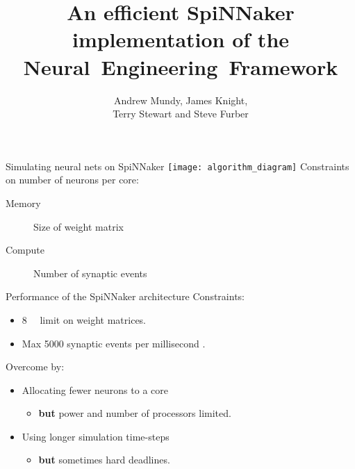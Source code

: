 \documentclass[handout,t]{beamer}
\title{An efficient SpiNNaker implementation of the Neural~Engineering~Framework}
\author{Andrew Mundy, James Knight,\\Terry Stewart and Steve Furber}
\begin{document}
  \maketitle

  \begin{frame}{Simulating neural nets on SpiNNaker}
    \vfill
    \hspace*{-.15\textwidth}\texttt{[image: algorithm\_diagram]}
    \vfill
    \pause
    Constraints on number of neurons per core:
    \begin{description}
      \item[Memory] Size of weight matrix
      \item[Compute] Number of synaptic events
    \end{description}
  \end{frame}

  \begin{frame}{Performance of the SpiNNaker architecture}
    Constraints:
    \begin{itemize}
      \item \SI{8}{\mebi\byte} limit on weight matrices.
      \item Max \num{5000} synaptic events per millisecond \parencite{Sharp2013}.
    \end{itemize}

    \pause
    Overcome by:
    \begin{itemize}[<+->]
      \item Allocating fewer neurons to a core
        \begin{itemize}
          \item \textbf{but} power and number of processors limited.
        \end{itemize}
      \item Using longer simulation time-steps
        \begin{itemize}
          \item \textbf{but} sometimes hard deadlines.
        \end{itemize}
    \end{itemize}
  \end{frame}

\end{document}
